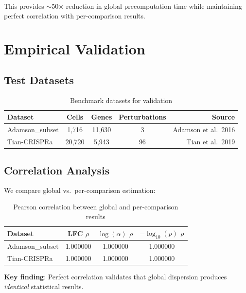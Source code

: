 \documentclass[11pt]{article}
\theoremstyle{definition}
\theoremstyle{remark}
\begin{document}
This provides $\sim$50$\times$ reduction in global precomputation time while maintaining perfect correlation with per-comparison results.

\section{Empirical Validation}

\subsection{Test Datasets}

\begin{table}[h]
\centering
\begin{tabular}{lcccr}
\toprule
\textbf{Dataset} & \textbf{Cells} & \textbf{Genes} & \textbf{Perturbations} & \textbf{Source} \\
\midrule
Adamson\_subset & 1,716 & 11,630 & 3 & Adamson et al.\ 2016 \\
Tian-CRISPRa & 20,720 & 5,943 & 96 & Tian et al.\ 2019 \\
\bottomrule
\end{tabular}
\caption{Benchmark datasets for validation}
\end{table}

\subsection{Correlation Analysis}

We compare global vs.\ per-comparison estimation:

\begin{table}[h]
\centering
\begin{tabular}{lccc}
\toprule
\textbf{Dataset} & \textbf{LFC $\rho$} & \textbf{$\log(\alpha)$ $\rho$} & \textbf{$-\log_{10}(p)$ $\rho$} \\
\midrule
Adamson\_subset & 1.000000 & 1.000000 & 1.000000 \\
Tian-CRISPRa & 1.000000 & 1.000000 & 1.000000 \\
\bottomrule
\end{tabular}
\caption{Pearson correlation between global and per-comparison results}
\end{table}

\textbf{Key finding}: Perfect correlation validates that global dispersion produces \emph{identical} statistical results.
\end{document}
